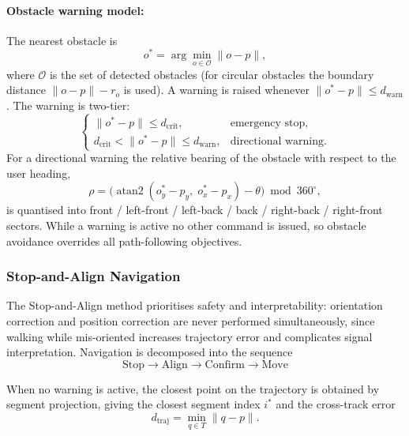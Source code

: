 \documentclass[12pt]{report}
\begin{document}
\paragraph{Obstacle warning model:}

The nearest obstacle is
\[
o^\ast=\arg\min_{o\in\mathcal{O}}\lVert o-p\rVert,
\]
where $\mathcal{O}$ is the set of detected obstacles (for circular obstacles the boundary distance $\lVert o-p\rVert-r_o$ is used). A warning is raised whenever $\lVert o^\ast-p\rVert\le d_{\text{warn}}$. The warning is two-tier:
\[
\begin{cases}
\lVert o^\ast-p\rVert \le d_{\text{crit}}, & \text{emergency stop},\\[4pt]
d_{\text{crit}} < \lVert o^\ast-p\rVert \le d_{\text{warn}}, & \text{directional warning}.
\end{cases}
\]
For a directional warning the relative bearing of the obstacle with respect to the user heading,
\[
\rho=\bigl(\operatorname{atan2}(o^\ast_y-p_y,\;o^\ast_x-p_x)-\theta\bigr)\bmod 360^\circ,
\]
is quantised into front / left-front / left-back / back / right-back / right-front sectors. While a warning is active no other command is issued, so obstacle avoidance overrides all path-following objectives.

\subsubsection*{Stop-and-Align Navigation}

The Stop-and-Align method prioritises safety and interpretability: orientation correction and position correction are never performed simultaneously, since walking while mis-oriented increases trajectory error and complicates signal interpretation. Navigation is decomposed into the sequence
\[
\text{Stop}\rightarrow\text{Align}\rightarrow\text{Confirm}\rightarrow\text{Move}
\]

When no warning is active, the closest point on the trajectory is obtained by segment projection, giving the closest segment index $i^\ast$ and the cross-track error
\[
d_{\text{traj}}=\min_{q\in T}\lVert q-p\rVert .
\]
\end{document}
